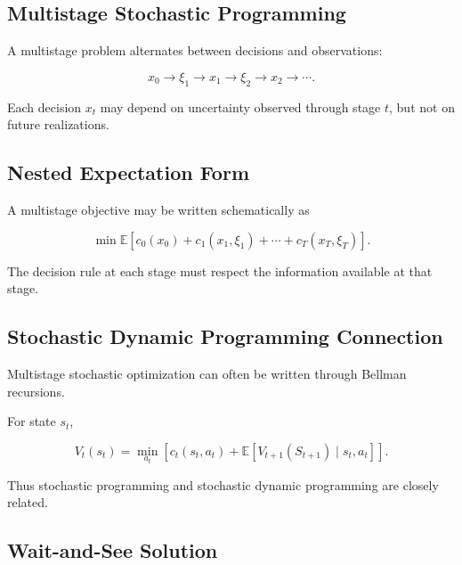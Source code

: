 \subsection{Multistage Stochastic Programming}
\label{subsec:multistage-stochastic-programming}

A multistage problem alternates between decisions and observations:

\[
\boxed{
x_0
\rightarrow
\xi_1
\rightarrow
x_1
\rightarrow
\xi_2
\rightarrow
x_2
\rightarrow
\cdots.
}
\]

Each decision \(x_t\) may depend on uncertainty observed through stage
\(t\), but not on future realizations.

\subsection{Nested Expectation Form}
\label{subsec:nested-expectation-stochastic}

A multistage objective may be written schematically as

\[
\boxed{
\min
\mathbb{E}
\left[
c_0(x_0)
+
c_1(x_1,\xi_1)
+
\cdots
+
c_T(x_T,\xi_T)
\right].
}
\]

The decision rule at each stage must respect the information available at
that stage.

\subsection{Stochastic Dynamic Programming Connection}
\label{subsec:stochastic-dp-connection}

Multistage stochastic optimization can often be written through Bellman
recursions.

For state \(s_t\),

\[
\boxed{
V_t(s_t)
=
\min_{a_t}
\left[
c_t(s_t,a_t)
+
\mathbb{E}
\left[
V_{t+1}(S_{t+1})
\mid
s_t,a_t
\right]
\right].
}
\]

Thus stochastic programming and stochastic dynamic programming are closely
related.

\subsection{Wait-and-See Solution}
\label{subsec:wait-and-see-solution}

